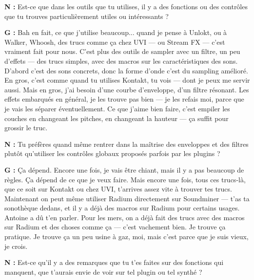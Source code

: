 ﻿\documentclass[12pt]{article}
\begin{document}
\textbf{N :} Est-ce que dans les outils que tu utilises, il y a des fonctions ou des contrôles que tu trouves particulièrement utiles ou intéressants ?

\textbf{G :} Bah en fait, ce que j'utilise beaucoup... quand je pense à Unlokt, ou à Walker, Whoosh, des trucs comme ça chez UVI — ou Stream FX — c'est vraiment fait pour nous. C'est plus des outils de sampler avec un filtre, un peu d'effets — des trucs simples, avec des macros sur les caractéristiques des sons. D'abord c'est des sons concrets, donc la forme d'onde c'est du sampling amélioré. En gros, c'est comme quand tu utilises Kontakt, tu vois — dont je peux me servir aussi. Mais en gros, j'ai besoin d'une courbe d'enveloppe, d'un filtre résonant. Les effets embarqués en général, je les trouve pas bien — je les refais moi, parce que je vais les séparer éventuellement. Ce que j'aime bien faire, c'est empiler les couches en changeant les pitches, en changeant la hauteur — ça suffit pour grossir le truc.

\textbf{N :} Tu préfères quand même rentrer dans la maîtrise des enveloppes et des filtres plutôt qu'utiliser les contrôles globaux proposés parfois par les plugins ?

\textbf{G :} Ça dépend. Encore une fois, je vais être chiant, mais il y a pas beaucoup de règles. Ça dépend de ce que je veux faire. Mais encore une fois, tous ces trucs-là, que ce soit sur Kontakt ou chez UVI, t'arrives assez vite à trouver tes trucs. Maintenant on peut même utiliser Radium directement sur Soundminer — t'as ta sonothèque dedans, et il y a déjà des macros sur Radium pour certains usages. Antoine a dû t'en parler. Pour les mers, on a déjà fait des trucs avec des macros sur Radium et des choses comme ça — c'est vachement bien. Je trouve ça pratique. Je trouve ça un peu usine à gaz, moi, mais c'est parce que je suis vieux, je crois.

\textbf{N :} Est-ce qu'il y a des remarques que tu t'es faites sur des fonctions qui manquent, que t'aurais envie de voir sur tel plugin ou tel synthé ?
\end{document}
